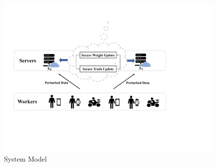 \documentclass[conference]{IEEEtran}
\begin{document}

\begin{figure}[htbp]
  \centering 
  \includegraphics[width=0.96\linewidth]{figures/system_model.pdf}
  \caption{System Model}
  \label{fig:sysmodel}
\end{figure}

\end{document}
